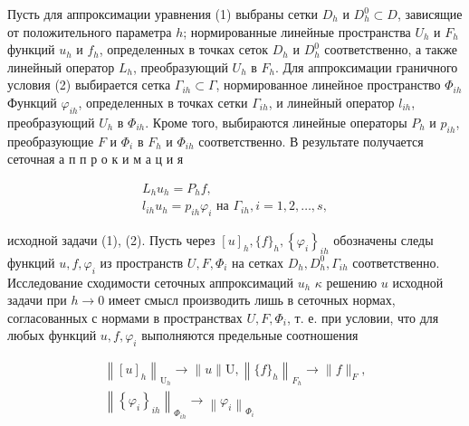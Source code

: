 \documentclass[10pt]{article}
\begin{document}
Пусть для аппроксимации уравнения (1) выбраны сетки $D_{h}$ и $D_{h}^{0} \subset D$, зависящие от положительного параметра $h$; нормированные линейные пространства $U_{h}$ и $F_{h}$ функций $u_{h}$ и $f_{h}$, определенных в точках сеток $D_{h}$ и $D_{h}^{0}$ соответственно, а также линейный оператор $L_{h}$, преобразующий $U_{h}$ в $F_{h}$. Для аппроксимации граничного условия (2) выбирается сетка $\Gamma_{i h} \subset \Gamma$, нормированное линейное пространство $\Phi_{i h}$ Функций $\varphi_{i h}$, определенных в точках сетки $\Gamma_{i h}$, и линейный оператор $l_{i h}$, преобразующий $U_{h}$ в $\Phi_{i h}$. Кроме того, выбираются линейные операторы $P_{h}$ и $p_{i h}$, преобразующие $F$ и $\Phi_{i}$ в $F_{h}$ и $\Phi_{i h}$ соответственно. В результате получается сеточная а п п р о к и м а ц и я



\[

\begin{gathered}

L_{h} u_{h}=P_{h} f, \\

l_{i h} u_{h}=p_{i h} \varphi_{i} \text { на } \Gamma_{i h}, i=1,2, \ldots, s,

\end{gathered}

\]



исходной задачи (1), (2). Пусть через $[u]_{h},\{f\}_{h},\left\{\varphi_{i}\right\}_{i h}$ обозначены следы функций $u, f, \varphi_{i}$ из пространств $U, F, \Phi_{i}$ на сетках $D_{h}, D_{h}^{0}, \Gamma_{i h}$ соответственно. Исследование сходимости сеточных аппроксимаций $u_{h}$ $\kappa$ решению $u$ исходной задачи при $h \rightarrow 0$ имеет смысл производить лишь в сеточных нормах, согласованных с нормами в пространствах $U, F, \Phi_{i}$, т. е. при условии, что для любых функций $u, f, \varphi_{i}$ выполняются предельные соотношения



\[

\begin{gathered}

\left\|[u]_{h}\right\|_{\mathrm{U}_{h}} \longrightarrow\|u\| \mathrm{U},\left\|\{f\}_{h}\right\|_{F_{h}} \rightarrow\|f\|_{F}, \\

\left\|\left\{\varphi_{i}\right\}_{i h}\right\|_{\Phi_{i h}} \longrightarrow\left\|\varphi_{i}\right\|_{\Phi_{i}}

\end{gathered}

\]
\end{document}

